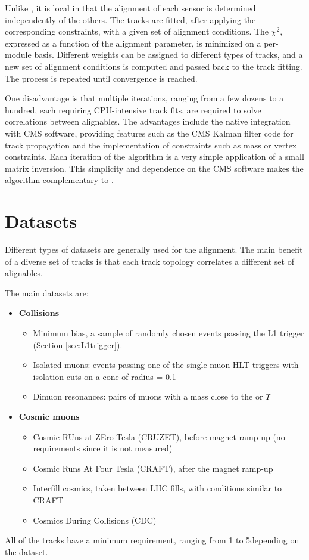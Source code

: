Unlike \MPII, it is local in that the alignment of each sensor is determined independently of the others.
The tracks are fitted, after applying the corresponding constraints,
with a given set of alignment conditions.
The $\chi^2$, expressed as a function of the alignment parameter, is minimized on a per-module basis.
Different weights can be assigned to different types of tracks,
and a new set of alignment conditions is computed and passed back to the track fitting.
The process is repeated until convergence is reached.

One disadvantage is that multiple iterations,
ranging from a few dozens to a hundred,
each requiring CPU-intensive track fits,
are required to solve correlations between alignables.
The advantages include the native integration with CMS software, providing features such as
the CMS Kalman filter code for track propagation
and the implementation of constraints such as mass or vertex constraints.
Each iteration of the algorithm is a very simple application of a small matrix inversion.
This simplicity and dependence on the CMS software makes the \HIPPY algorithm complementary to \MPII.

\section{Datasets}
Different types of datasets are generally used for the alignment.
The main benefit of a diverse set of tracks is that each track topology correlates a different set of alignables.

The main datasets are:
\begin{itemize}
\item \textbf{Collisions}
  \begin{itemize}
  \item Minimum bias, a sample of randomly chosen events passing the L1 trigger (Section \ref{sec:L1trigger}).
  \item Isolated muons: events passing one of the single muon HLT triggers with isolation cuts on a cone of radius \DR = 0.1
  \item Dimuon resonances: pairs of muons with a mass close to the \PZ or $\Upsilon$ %
  \end{itemize}
\item \textbf{Cosmic muons}
  \begin{itemize}
  \item Cosmic RUns at ZEro Tesla (CRUZET), before magnet ramp up (no \pt requirements since it is not measured)
  \item Cosmic Runs At Four Tesla (CRAFT), after the magnet ramp-up
  \item Interfill cosmics, taken between LHC fills, with conditions similar to CRAFT
  \item Cosmics During Collisions (CDC)
  \end{itemize}
\end{itemize}
All of the tracks have a minimum \pt requirement, ranging from 1 to 5\GeV depending on the dataset.

